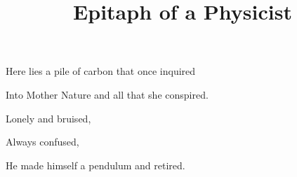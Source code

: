 \documentclass{article}
\title{Epitaph of a Physicist}
\begin{document}
 \newline

Here lies a pile of carbon that once inquired \newline

Into Mother Nature and all that she conspired. \newline

Lonely and bruised, \newline

Always confused, \newline

He made himself a pendulum and retired.
\end{document}
